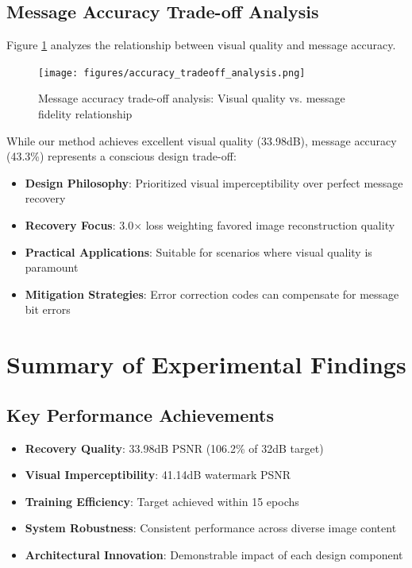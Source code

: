 \documentclass[12pt,a4paper]{report}
\begin{document}
\subsection{Message Accuracy Trade-off Analysis}

Figure \ref{fig:accuracy_tradeoff} analyzes the relationship between visual quality and message accuracy.

\begin{figure}[H]
    \centering
    \texttt{[image: figures/accuracy\_tradeoff\_analysis.png]}
    \caption{Message accuracy trade-off analysis: Visual quality vs. message fidelity relationship}
    \label{fig:accuracy_tradeoff}
\end{figure}

While our method achieves excellent visual quality (33.98dB), message accuracy (43.3\%) represents a conscious design trade-off:

\begin{itemize}
    \item \textbf{Design Philosophy}: Prioritized visual imperceptibility over perfect message recovery
    \item \textbf{Recovery Focus}: 3.0× loss weighting favored image reconstruction quality
    \item \textbf{Practical Applications}: Suitable for scenarios where visual quality is paramount
    \item \textbf{Mitigation Strategies}: Error correction codes can compensate for message bit errors
\end{itemize}

\section{Summary of Experimental Findings}

\subsection{Key Performance Achievements}

\begin{itemize}
    \item \textbf{Recovery Quality}: 33.98dB PSNR (106.2\% of 32dB target)
    \item \textbf{Visual Imperceptibility}: 41.14dB watermark PSNR
    \item \textbf{Training Efficiency}: Target achieved within 15 epochs
    \item \textbf{System Robustness}: Consistent performance across diverse image content
    \item \textbf{Architectural Innovation}: Demonstrable impact of each design component
\end{itemize}
\end{document}
